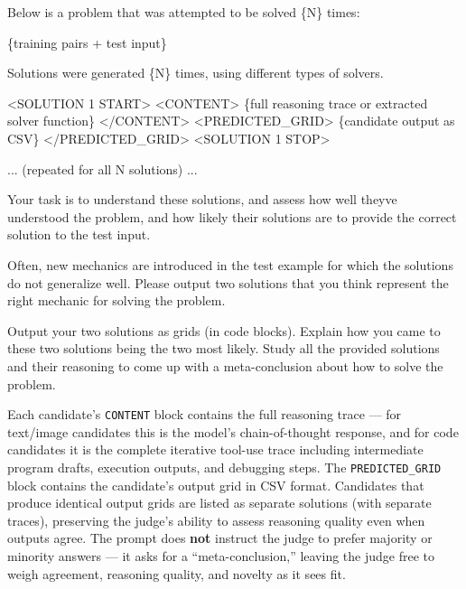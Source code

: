\documentclass[11pt]{article}
\newenvironment{Shaded}{}{}
\newcommand{\NormalTok}[1]{#1}
\renewenvironment{Shaded}{\begin{snugshade}}{\end{snugshade}}
\begin{document}
\begin{Shaded}
\begin{Highlighting}[]
\NormalTok{Below is a problem that was attempted to be solved \{N\} times:}

\NormalTok{\{training pairs + test input\}}

\NormalTok{Solutions were generated \{N\} times, using different types of solvers.}

\NormalTok{\textless{}SOLUTION 1 START\textgreater{}}
\NormalTok{\textless{}CONTENT\textgreater{}}
\NormalTok{\{full reasoning trace or extracted solver function\}}
\NormalTok{\textless{}/CONTENT\textgreater{}}
\NormalTok{\textless{}PREDICTED\_GRID\textgreater{}}
\NormalTok{\{candidate output as CSV\}}
\NormalTok{\textless{}/PREDICTED\_GRID\textgreater{}}
\NormalTok{\textless{}SOLUTION 1 STOP\textgreater{}}

\NormalTok{... (repeated for all N solutions) ...}

\NormalTok{Your task is to understand these solutions, and assess how well they\textquotesingle{}ve}
\NormalTok{understood the problem, and how likely their solutions are to provide the}
\NormalTok{correct solution to the test input.}

\NormalTok{Often, new mechanics are introduced in the test example for which the}
\NormalTok{solutions do not generalize well. Please output two solutions that you}
\NormalTok{think represent the right mechanic for solving the problem.}

\NormalTok{Output your two solutions as grids (in code blocks). Explain how you}
\NormalTok{came to these two solutions being the two most likely. Study all the}
\NormalTok{provided solutions and their reasoning to come up with a meta{-}conclusion}
\NormalTok{about how to solve the problem.}
\end{Highlighting}
\end{Shaded}

Each candidate's \texttt{CONTENT} block contains the full reasoning
trace --- for text/image candidates this is the model's chain-of-thought
response, and for code candidates it is the complete iterative tool-use
trace including intermediate program drafts, execution outputs, and
debugging steps. The \texttt{PREDICTED\_GRID} block contains the
candidate's output grid in CSV format. Candidates that produce identical
output grids are listed as separate solutions (with separate traces),
preserving the judge's ability to assess reasoning quality even when
outputs agree. The prompt does \textbf{not} instruct the judge to prefer
majority or minority answers --- it asks for a ``meta-conclusion,''
leaving the judge free to weigh agreement, reasoning quality, and
novelty as it sees fit.
\end{document}
